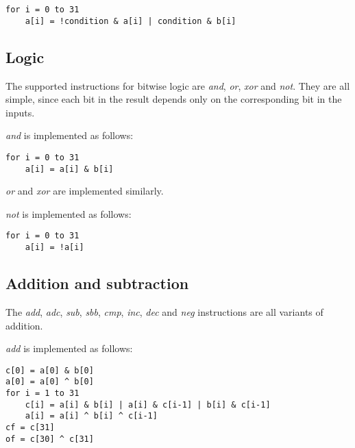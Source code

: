 \documentclass[a4paper,11pt]{kth-mag}
\begin{document}
\begin{verbatim}
for i = 0 to 31
    a[i] = !condition & a[i] | condition & b[i]
\end{verbatim}




\subsection{Logic}

The supported instructions for bitwise logic are \emph{and}, \emph{or}, \emph{xor} and \emph{not}.
They are all simple, since each bit in the result depends only on the corresponding bit in the inputs.

\emph{and} is implemented as follows:

\begin{verbatim}
for i = 0 to 31
    a[i] = a[i] & b[i]
\end{verbatim}

\emph{or} and \emph{xor} are implemented similarly.

\emph{not} is implemented as follows:

\begin{verbatim}
for i = 0 to 31
    a[i] = !a[i]
\end{verbatim}

\subsection{Addition and subtraction}

The \emph{add}, \emph{adc}, \emph{sub}, \emph{sbb}, \emph{cmp}, \emph{inc}, \emph{dec} and \emph{neg} instructions are all variants of addition.

\emph{add} is implemented as follows:

\begin{verbatim}
c[0] = a[0] & b[0]
a[0] = a[0] ^ b[0]
for i = 1 to 31
    c[i] = a[i] & b[i] | a[i] & c[i-1] | b[i] & c[i-1]
    a[i] = a[i] ^ b[i] ^ c[i-1]
cf = c[31]
of = c[30] ^ c[31]
\end{verbatim}
\end{document}
